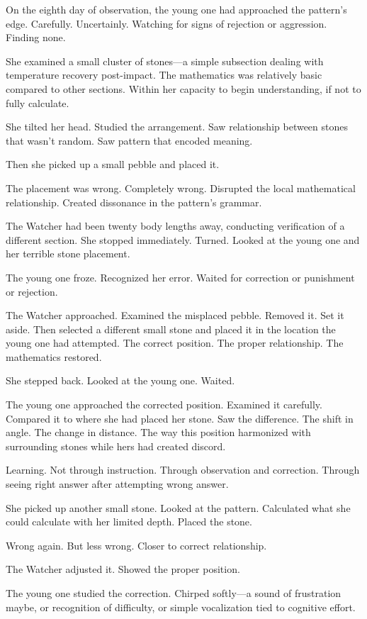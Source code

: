 On the eighth day of observation, the young one had approached the pattern's edge. Carefully. Uncertainly. Watching for signs of rejection or aggression. Finding none.

She examined a small cluster of stones—a simple subsection dealing with temperature recovery post-impact. The mathematics was relatively basic compared to other sections. Within her capacity to begin understanding, if not to fully calculate.

She tilted her head. Studied the arrangement. Saw relationship between stones that wasn't random. Saw pattern that encoded meaning.

Then she picked up a small pebble and placed it.

The placement was wrong. Completely wrong. Disrupted the local mathematical relationship. Created dissonance in the pattern's grammar.

The Watcher had been twenty body lengths away, conducting verification of a different section. She stopped immediately. Turned. Looked at the young one and her terrible stone placement.

The young one froze. Recognized her error. Waited for correction or punishment or rejection.

The Watcher approached. Examined the misplaced pebble. Removed it. Set it aside. Then selected a different small stone and placed it in the location the young one had attempted. The correct position. The proper relationship. The mathematics restored.

She stepped back. Looked at the young one. Waited.

The young one approached the corrected position. Examined it carefully. Compared it to where she had placed her stone. Saw the difference. The shift in angle. The change in distance. The way this position harmonized with surrounding stones while hers had created discord.

Learning. Not through instruction. Through observation and correction. Through seeing right answer after attempting wrong answer.

She picked up another small stone. Looked at the pattern. Calculated what she could calculate with her limited depth. Placed the stone.

Wrong again. But less wrong. Closer to correct relationship.

The Watcher adjusted it. Showed the proper position.

The young one studied the correction. Chirped softly—a sound of frustration maybe, or recognition of difficulty, or simple vocalization tied to cognitive effort.

